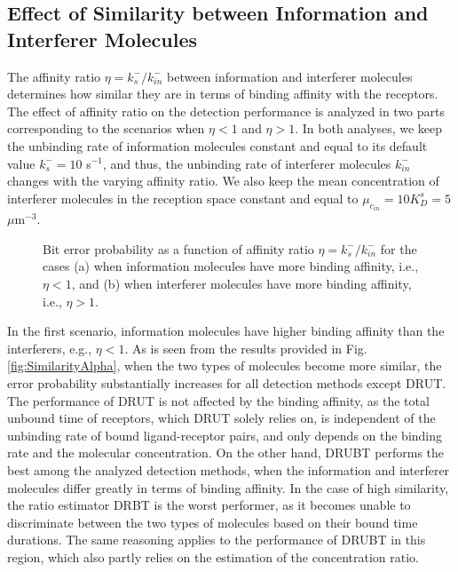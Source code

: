\documentclass[twocolumn]{IEEEtran}
\begin{document}
\subsection{Effect of Similarity between Information and Interferer Molecules}
The affinity ratio $\eta = k_s^-/k_{in}^-$ between information and interferer molecules determines how similar they are in terms of binding affinity with the receptors. The effect of affinity ratio on the detection performance is analyzed in two parts corresponding to the scenarios when $\eta<1$ and $\eta>1$. In both analyses, we keep the unbinding rate of information molecules constant and equal to its default value $k_s^- = 10$ s$^{-1}$, and thus, the unbinding rate of interferer molecules $k_{in}^-$ changes with the varying affinity ratio. We also keep the mean concentration of interferer molecules in the reception space constant and equal to 
$\mu_{c_{in}} = 10 K_D^s = 5$ $\mu$m$^{-3}$.
\begin{figure*}[!t]
	\centering
	\caption{Bit error probability as a function of affinity ratio $\eta = k_s^-/k_{in}^-$ for the cases (a) when information molecules have more binding affinity, i.e., $\eta <1$, and (b) when interferer molecules have more binding affinity, i.e., $\eta >1$. }
	\label{fig:SimilarityAlphaMain}
\end{figure*}

In the first scenario, information molecules have higher binding affinity than the interferers, e.g., $\eta<1$. As is seen from the results provided in Fig. \ref{fig:SimilarityAlpha}, when the two types of molecules become more similar, the error probability substantially increases for all detection methods except DRUT. The performance of DRUT is not affected by the binding affinity, as the total unbound time of receptors, which DRUT solely relies on, is independent of the unbinding rate of bound ligand-receptor pairs, and only depends on the binding rate and the molecular concentration. On the other hand, DRUBT performs the best among the analyzed detection methods, when the information and interferer molecules differ greatly in terms of binding affinity. In the case of high similarity, the ratio estimator DRBT is the worst performer, as it becomes unable to discriminate between the two types of molecules based on their bound time durations. The same reasoning applies to the performance of DRUBT in this region, which also partly relies on the estimation of the concentration ratio. 
\end{document}
